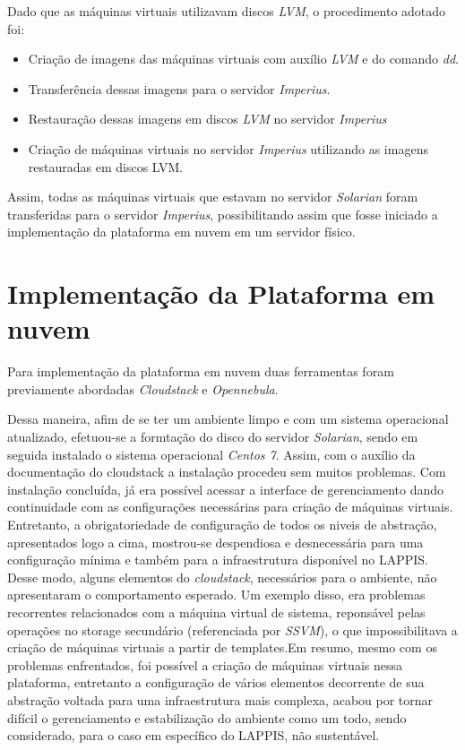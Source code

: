 Dado que as máquinas virtuais utilizavam discos \textit{LVM}, o procedimento adotado foi:
\begin{itemize}
  \item Criação de imagens das máquinas virtuais com auxílio  \textit{LVM} e do comando \textit{dd}.
  \item Transferência dessas imagens para o servidor \textit{Imperius}.
  \item Restauração dessas imagens em discos \textit{LVM} no servidor \textit{Imperius}
  \item Criação de máquinas virtuais no servidor \textit{Imperius} utilizando as imagens restauradas em discos LVM.
  
\end{itemize}

Assim, todas as máquinas virtuais que estavam no servidor \textit{Solarian} foram transferidas para o servidor \textit{Imperius}, possibilitando assim que fosse iniciado a implementação da plataforma em nuvem em um servidor físico.


\section{Implementação da Plataforma em nuvem}
Para implementação da plataforma em nuvem duas ferramentas foram previamente abordadas \textit{Cloudstack} e \textit{Opennebula}. 

Dessa maneira, afim de se ter um ambiente limpo e com um sistema operacional atualizado, efetuou-se a formtação do disco do servidor \textit{Solarian}, sendo em seguida instalado o sistema operacional \textit{Centos 7}. Assim, com o auxílio da documentação do cloudstack a instalação procedeu sem muitos problemas. Com instalação concluída, já era possível acessar a interface de gerenciamento dando continuidade com as configurações necessárias para criação de máquinas virtuais. Entretanto, a obrigatoriedade de configuração de todos os niveis de abstração, apresentados logo a cima, mostrou-se despendiosa e desnecessária para uma configuração mínima e também para a infraestrutura disponível no LAPPIS. Desse modo, alguns elementos do \textit{cloudstack}, necessários para o ambiente, não apresentaram o comportamento esperado. Um exemplo disso, era problemas recorrentes relacionados com a máquina virtual de sistema, reponsável pelas operações no storage secundário (referenciada por \textit{SSVM}), o que impossibilitava a criação de máquinas virtuais a partir de templates.Em resumo, mesmo com os problemas enfrentados, foi possível a criação de máquinas virtuais nessa plataforma, entretanto a configuração de vários elementos decorrente de sua abstração voltada para uma infraestrutura mais complexa, acabou por tornar difícil o gerenciamento e estabilização do ambiente como um todo, sendo considerado, para o caso em específico do LAPPIS, não sustentável.

